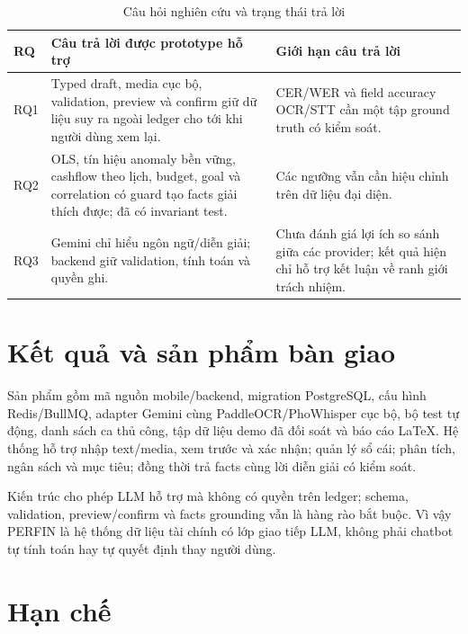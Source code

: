 \begin{table}[H]
  \centering
  \caption{Câu hỏi nghiên cứu và trạng thái trả lời}
  \label{tab:research-questions}
  \begin{tabularx}{\textwidth}{@{}L{1.2cm}Y Y@{}}
    \toprule
    \textbf{RQ} & \textbf{Câu trả lời được prototype hỗ trợ} & \textbf{Giới hạn câu trả lời} \\
    \midrule
    RQ1 & Typed draft, media cục bộ, validation, preview và confirm giữ dữ liệu suy ra ngoài ledger cho tới khi người dùng xem lại. & CER/WER và field accuracy OCR/STT cần một tập ground truth có kiểm soát. \\
    RQ2 & OLS, tín hiệu anomaly bền vững, cashflow theo lịch, budget, goal và correlation có guard tạo facts giải thích được; đã có invariant test. & Các ngưỡng vẫn cần hiệu chỉnh trên dữ liệu đại diện. \\
    RQ3 & Gemini chỉ hiểu ngôn ngữ/diễn giải; backend giữ validation, tính toán và quyền ghi. & Chưa đánh giá lợi ích so sánh giữa các provider; kết quả hiện chỉ hỗ trợ kết luận về ranh giới trách nhiệm. \\
    \bottomrule
  \end{tabularx}
\end{table}

\section{Kết quả và sản phẩm bàn giao}

Sản phẩm gồm mã nguồn mobile/backend, migration PostgreSQL, cấu hình Redis/BullMQ, adapter Gemini cùng PaddleOCR/PhoWhisper cục bộ, bộ test tự động, danh sách ca thủ công, tập dữ liệu demo đã đối soát và báo cáo LaTeX. Hệ thống hỗ trợ nhập text/media, xem trước và xác nhận; quản lý sổ cái; phân tích, ngân sách và mục tiêu; đồng thời trả facts cùng lời diễn giải có kiểm soát.

Kiến trúc cho phép LLM hỗ trợ mà không có quyền trên ledger; schema, validation, preview/confirm và facts grounding vẫn là hàng rào bắt buộc. Vì vậy PERFIN là hệ thống dữ liệu tài chính có lớp giao tiếp LLM, không phải chatbot tự tính toán hay tự quyết định thay người dùng.

\section{Hạn chế}

